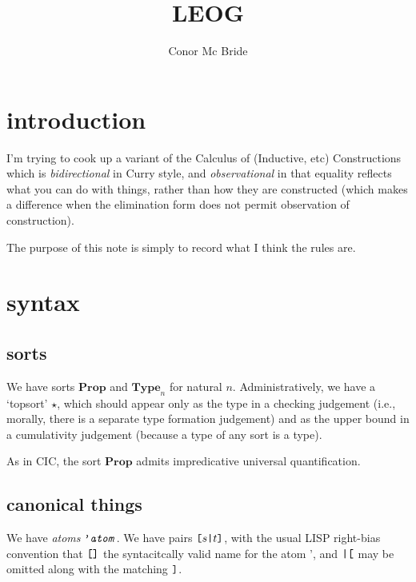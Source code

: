 \documentclass{article}
\newcommand{\lsq}{\texttt{\symbol{91}}}
\newcommand{\bsl}{\texttt{\symbol{92}}}
\newcommand{\rsq}{\texttt{\symbol{93}}}
\newcommand{\lcu}{\texttt{\symbol{123}}}
\newcommand{\lba}{\texttt{\symbol{124}}}
\newcommand{\rcu}{\texttt{\symbol{125}}}
\begin{document}
\title{LEOG}
\author{Conor Mc Bride}
\maketitle

\section{introduction}

I'm trying to cook up a variant of the Calculus of (Inductive, etc) Constructions which is \emph{bidirectional} in Curry style, and \emph{observational} in that equality reflects what you can do with things, rather than how they are constructed (which makes a difference when the elimination form does not permit observation of construction).

The purpose of this note is simply to record what I think the rules are.


\section{syntax}

\newcommand{\Prop}{\textbf{Prop}}
\newcommand{\Type}[1]{\textbf{Type}_{#1}}
\newcommand{\TYPE}{\star}

\subsection{sorts}

We have sorts $\Prop$ and $\Type{n}$ for natural $n$. Administratively, we have a `topsort' $\TYPE$, which should appear only as the type in a checking judgement (i.e., morally, there is a separate type formation judgement) and as the upper bound in a cumulativity judgement (because a type of any sort is a type).

As in CIC, the sort $\Prop$ admits impredicative universal quantification.


\subsection{canonical things}

\newcommand{\A}[1]{\texttt{'#1}}
\newcommand{\nil}{\lsq\rsq}
\newcommand{\X}[2]{\lsq#1\lba#2\rsq}
\newcommand{\B}[2]{\bsl#1\texttt{.}\,#2}
\newcommand{\E}[2]{#1\lcu#2\rcu}
\newcommand{\PI}[3]{\lsq\A{Pi}\;#1\;\B{#2}{#3}\rsq}

We have \emph{atoms} $\A{\textit{atom}}$. We have pairs $\X st$, with the usual LISP right-bias convention that $\nil$ the syntacitcally valid name for the atom $\A{}$, and $\lba\lsq$ may be omitted along with the matching $\rsq$.
\end{document}
